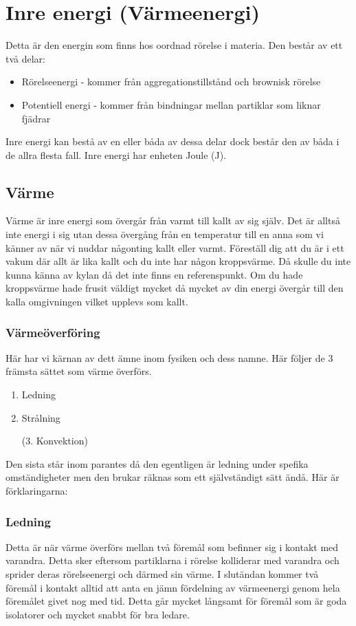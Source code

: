 \section{Inre energi (Värmeenergi)}
Detta är den energin som finns hos oordnad rörelse i materia. Den består av ett två delar:
\begin{itemize}
    \item Rörelseenergi - kommer från aggregationstillstånd och brownisk rörelse
    \item Potentiell energi - kommer från bindningar mellan partiklar som liknar fjädrar
\end{itemize}
Inre energi kan bestå av en eller båda av dessa delar dock består den av båda i de allra flesta fall. Inre energi har enheten Joule (J).
\subsection{Värme}
Värme är inre energi som övergår från varmt till kallt av sig själv. Det är alltså inte energi i sig utan dessa övergång från en temperatur till en anna som vi känner av när vi nuddar någonting kallt eller varmt. Föreställ dig att du är i ett vakum där allt är lika kallt och du inte har någon kroppsvärme. Då skulle du inte kunna känna av kylan då det inte finns en referenspunkt. Om du hade kroppsvärme hade frusit väldigt mycket då mycket av din energi övergår till den kalla omgivningen vilket upplevs som kallt.
\subsubsection{Värmeöverföring}
Här har vi kärnan av dett ämne inom fysiken och dess namne. Här följer de 3 främsta sättet som värme överförs.
\begin{enumerate}
    \item Ledning
    \item Strålning
    \item[(3.] Konvektion)
\end{enumerate}
Den sista står inom parantes då den egentligen är ledning under spefika omständigheter men den brukar räknas som ett självständigt sätt ändå. Här är förklaringarna:
\subsubsection*{Ledning}
Detta är när värme överförs mellan två föremål som befinner sig i kontakt med varandra. Detta sker eftersom partiklarna i rörelse kolliderar med varandra och sprider deras rörelseenergi och därmed sin värme. I slutändan kommer två föremål i kontakt alltid att anta en jämn fördelning av värmeenergi genom hela föremålet givet nog med tid. Detta går mycket långsamt för föremål som är goda isolatorer och mycket snabbt för bra ledare.
